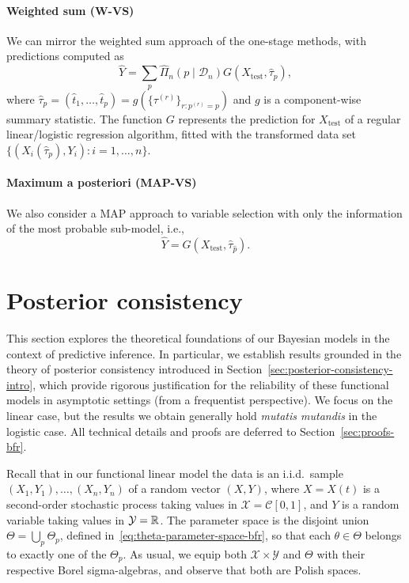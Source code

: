\paragraph{Weighted sum (W-VS)} We can mirror the weighted sum approach of the one-stage methods, with predictions computed as
\[
\hat Y = \sum_{p} \hat\Pi_n(p\mid \mathcal D_n) G(X_{\text{test}}, \hat \tau_{p}),
\]
where \(\hat \tau_{p}=(\hat t_1, \dots ,\hat t_p)=g(\{\tau^{(r)}\}_{r:p^{(r)}=p})\) and \(g\) is a component-wise summary statistic. The function \(G\) represents the prediction for \(X_{\text{test}}\) of a regular linear/logistic regression algorithm, fitted with the transformed data set \(\{(X_i(\hat \tau_p), Y_i): i=1,\dots,n\}\).

\paragraph{Maximum a posteriori (MAP-VS)} We also consider a \acs{MAP} approach to variable selection with only the information of the most probable sub-model, i.e., 
\[
\hat Y = G(X_{\text{test}}, \hat \tau_{\hat p}).
\]

\section{Posterior consistency}\label{sec:consistency-bfr}

This section explores the theoretical foundations of our Bayesian models in the context of predictive inference. In particular, we establish results grounded in the theory of posterior consistency introduced in Section~\ref{sec:posterior-consistency-intro}, which provide rigorous justification for the reliability of these functional models in asymptotic settings (from a frequentist perspective). We focus on the linear case, but the results we obtain generally hold \textit{mutatis mutandis} in the logistic case. All technical details and proofs are deferred to Section~\ref{sec:proofs-bfr}.

Recall that in our functional linear model the data is an i.i.d.\ sample \((X_1, Y_1), \ldots, (X_n, Y_n)\) of a random vector \((X,Y)\), where \(X=X(t)\) is a second-order stochastic process taking values in \(\mathcal X=\mathcal C[0,1]\), and \(Y\) is a random variable taking values in \(\mathcal Y=\mathbb{R}\). The parameter space is the disjoint union \(\Theta=\bigcup_p \Theta_p\), defined in~\eqref{eq:theta-parameter-space-bfr}, so that each \(\theta\in\Theta\) belongs to exactly one of the \(\Theta_p\). As usual, we equip both \(\mathcal X \times \mathcal Y\) and \(\Theta\) with their respective Borel sigma-algebras, and observe that both are Polish spaces.

